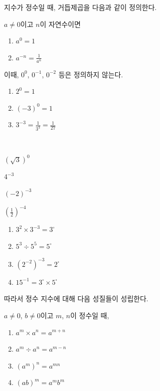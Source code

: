 \documentclass{oblivoir}
\begin{document}
\noindent
지수가 정수일 때, 거듭제곱을 다음과 같이 정의한다.
%
\begin{mdframed}
\label{integer2}
\(a\neq0\)이고 \(n\)이 자연수이면
\begin{enumerate}
\item
\(a^0=1\)
\item
\(\displaystyle a^{-n}=\frac1{a^n}\)
\end{enumerate}
\end{mdframed}
이때, \(0^0\), \(0^{-1}\), \(0^{-2}\) 등은 정의하지 않는다.

%
\exam{}
\begin{enumerate}\label{integer3}
\item
\(2^0=1\)
\item
\((-3)^0=1\)
\item
\(\displaystyle3^{-3}=\frac1{3^3}=\frac1{27}\)
\end{enumerate}

%
\label{integer4}
\\
\begin{enumerate*}[itemjoin=\hspace{0.15\textwidth}]
\item
\((\sqrt3)^0\)
\item
\(4^{-3}\)
\item
\((-2)^{-3}\)
\item
\(\displaystyle\left(\frac12\right)^{-4}\)
\end{enumerate*}

\newpage
%
\begin{enumerate}\label{integer5}
\item
\(3^2\times3^{-3}=3^\square\)
\item
\(5^3\div5^5=5^\square\)
\item
\(\left(2^{-2}\right)^{-3}=2^\square\)
\item
\(15^{-1}=3^\square\times5^\square\)
\end{enumerate}

\noindent
따라서 정수 지수에 대해 다음 성질들이 성립한다.
%
\begin{mdframed}
\label{integer6}
\(a\neq0\), \(b\neq0\)이고 \(m\), \(n\)이 정수일 때,
\begin{enumerate}
\item
\(a^m\times a^n=a^{m+n}\)
\item
\(a^m\div a^n=a^{m-n}\)
\item
\((a^m)^n=a^{mn}\)
\item
\((ab)^m=a^mb^m\)
\end{enumerate}
\end{mdframed}
\end{document}
